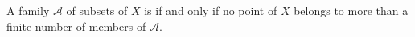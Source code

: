 A family $\mathcal{A}$ of subsets of $X$ is  if and only if no point of $X$ belongs to more than a finite number of members of $\mathcal{A}$.
